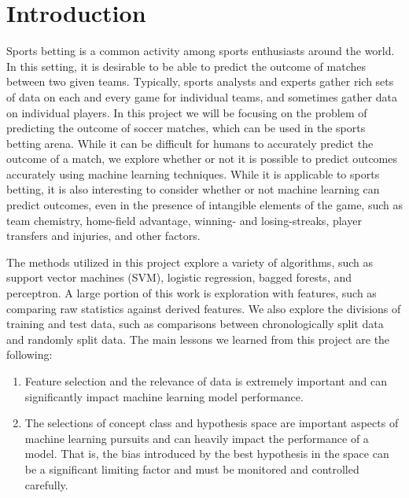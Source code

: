\section{Introduction} 

Sports betting is a common activity among sports enthusiasts around the world. In this setting, it is desirable to be able to predict the outcome of matches between two given teams. Typically, sports analysts and experts gather rich sets of data on each and every game for individual teams, and sometimes gather data on individual players. In this project we will be focusing on the problem of predicting the outcome of soccer matches, which can be used in the sports betting arena. While it can be difficult for humans to accurately predict the outcome of a match, we explore whether or not it is possible to predict outcomes accurately using machine learning techniques. While it is applicable to sports betting, it is also interesting to consider whether or not machine learning can predict outcomes, even in the presence of intangible elements of the game, such as team chemistry, home-field advantage, winning- and losing-streaks, player transfers and injuries, and other factors.

The methods utilized in this project explore a variety of algorithms, such as support vector machines (SVM), logistic regression, bagged forests, and perceptron. A large portion of this work is exploration with features, such as comparing raw statistics against derived features. We also explore the divisions of training and test data, such as comparisons between chronologically split data and randomly split data. The main lessons we learned from this project are the following:

\begin{enumerate}
\item Feature selection and the relevance of data is extremely important and can significantly impact machine learning model performance.
\item The selections of concept class and hypothesis space are important aspects of machine learning pursuits and can heavily impact the performance of a model. That is, the bias introduced by the best hypothesis in the space can be a significant limiting factor and must be monitored and controlled carefully.
\end{enumerate}

